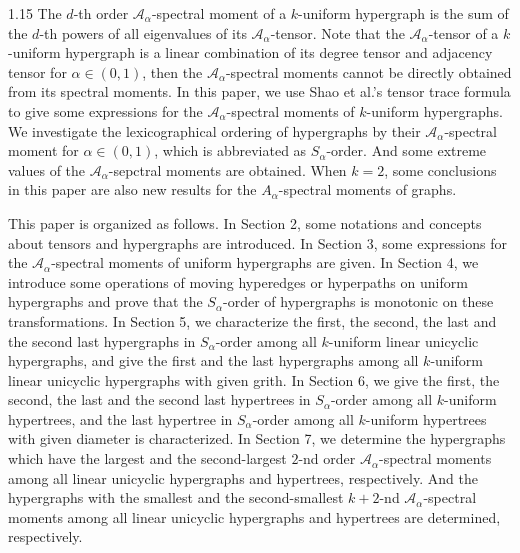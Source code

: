 \documentclass[preprint,12pt]{elsarticle1}
\numberwithin{equation}{section}
\begin{document}
\begin{spacing}{1.15}
The $d$-th order $\mathcal{A}_{\alpha}$-spectral moment of a $k$-uniform hypergraph is the sum of the $d$-th powers of all eigenvalues of its $\mathcal{A}_{\alpha}$-tensor.
Note that the $\mathcal{A}_{\alpha}$-tensor of a $k$-uniform hypergraph is a linear combination of its degree tensor and adjacency tensor for $\alpha\in(0,1)$, then the $\mathcal{A}_{\alpha}$-spectral moments cannot be directly obtained from its spectral moments.
In this paper, we use Shao et al.'s tensor trace formula to give some expressions for the $\mathcal{A}_{\alpha}$-spectral moments of $k$-uniform hypergraphs.
We investigate the lexicographical ordering of hypergraphs by their $\mathcal{A}_{\alpha}$-spectral moment for $\alpha\in(0,1)$, which is abbreviated as $S_{\alpha}$-order.
And some extreme values of the $\mathcal{A}_{\alpha}$-sepctral moments are obtained.
When $k=2$, some conclusions in this paper are also new results for the $A_{\alpha}$-spectral moments of graphs.

This paper is organized as follows.
In Section 2, some notations and concepts about tensors and hypergraphs are introduced.
In Section 3, some expressions for the $\mathcal{A}_{\alpha}$-spectral moments of uniform hypergraphs are given.
In Section 4, we introduce some operations of moving hyperedges or hyperpaths on uniform hypergraphs and prove that the $S_{\alpha}$-order of hypergraphs is monotonic on these transformations.
In Section 5, we characterize the first, the second, the last and the second last hypergraphs in $S_{\alpha}$-order among all $k$-uniform linear unicyclic hypergraphs, and give the first and the last hypergraphs among all $k$-uniform linear unicyclic hypergraphs with given grith.
In Section 6, we give the first, the second, the last and the second last hypertrees in $S_{\alpha}$-order among all $k$-uniform hypertrees, and the last hypertree in $S_{\alpha}$-order among all $k$-uniform hypertrees with given diameter is characterized.
In Section 7, we determine the hypergraphs which have the largest and the second-largest $2$-nd order $\mathcal{A}_{\alpha}$-spectral moments among all linear unicyclic hypergraphs and hypertrees, respectively. And the hypergraphs with the smallest and the second-smallest $k+2$-nd $\mathcal{A}_{\alpha}$-spectral moments among all linear unicyclic hypergraphs and hypertrees are determined, respectively.




\end{spacing}
\end{document}
